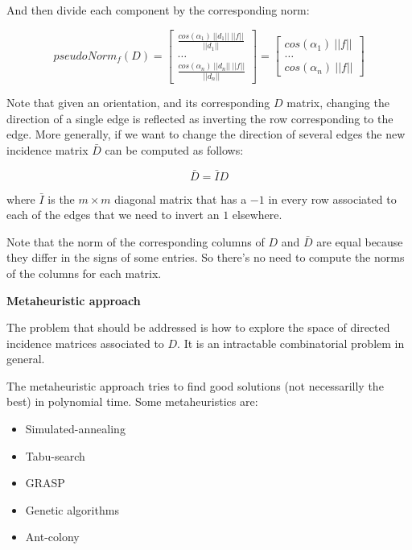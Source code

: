 \documentclass[a4paper,11pt]{article}
\begin{document}
\bigskip

And then divide each component by the corresponding norm:

$$
pseudoNorm_f(D) = \begin{bmatrix}
	\frac{cos(\alpha_1) \ ||d_1|| \ ||f||}{||d_1||}\\
	\dots \\
	\frac{cos(\alpha_n) \ ||d_n|| \ ||f||}{||d_n||}
\end{bmatrix} = \begin{bmatrix}
	cos(\alpha_1) \ ||f||\\
	\dots \\
	cos(\alpha_n) \ ||f||
\end{bmatrix}
$$

\bigskip


Note that given an orientation, and its 
corresponding $D$ matrix, changing the direction of a single edge is 
reflected as inverting the row corresponding to the edge. More generally, 
if we want to change the direction of several edges the new incidence 
matrix $\bar{D}$ can be computed as follows:

$$\bar{D} = \bar{I} D$$

\bigskip

where $\bar{I}$ is the $m \times m$ diagonal matrix that has a $-1$ in 
every row associated to each of the edges that we need to invert an $1$ 
elsewhere.

\bigskip


Note that the norm of the corresponding columns of $D$ and $\bar{D}$ are  
equal because they differ in the signs of some entries. So there's no 
need to compute the norms of the columns for each matrix. 

\bigskip

\textbf{Metaheuristic approach}

\bigskip

The problem that should be addressed is how to explore the space of 
directed incidence matrices associated to $D$. It is an intractable 
combinatorial problem in general. 

\bigskip

The metaheuristic approach tries to find good solutions (not 
necessarilly the best) in polynomial time. Some metaheuristics are:

\begin{itemize}
	\item Simulated-annealing
	\item Tabu-search
	\item GRASP
	\item Genetic algorithms
	\item Ant-colony
\end{itemize}
\end{document}
